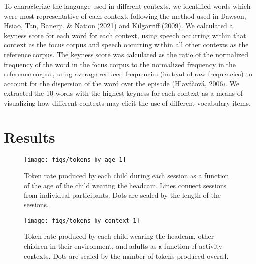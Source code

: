 \documentclass[10pt, letterpaper]{article}
\newenvironment{CodeChunk}{}{}
\begin{document}
To characterize the language used in different contexts, we identified
words which were most representative of each context, following the
method used in Dawson, Hsiao, Tan, Banerji, \& Nation (2021) and
Kilgarriff (2009). We calculated a keyness score for each word for each
context, using speech occurring within that context as the focus corpus
and speech occurring within all other contexts as the reference corpus.
The keyness score was calculated as the ratio of the normalized
frequency of the word in the focus corpus to the normalized frequency in
the reference corpus, using average reduced frequencies (instead of raw
frequencies) to account for the dispersion of the word over the episode
(Hlaváčová, 2006). We extracted the 10 words with the highest keyness
for each context as a means of visualizing how different contexts may
elicit the use of different vocabulary items.

\hypertarget{results}{%
\section{Results}\label{results}}

\begin{CodeChunk}
\begin{figure}[b!]

{\centering \texttt{[image: figs/tokens-by-age-1]} 

}

\caption[Token rate produced by each child during each session as a function of the age of the child wearing the headcam]{Token rate produced by each child during each session as a function of the age of the child wearing the headcam. Lines connect sessions from individual participants. Dots are scaled by the length of the sessions.}\label{fig:tokens-by-age}
\end{figure}
\end{CodeChunk}

\begin{CodeChunk}
\begin{figure}[b!]

{\centering \texttt{[image: figs/tokens-by-context-1]} 

}

\caption[Token rate produced by each child wearing the headcam, other children in their environment, and adults as a function of activity contexts]{Token rate produced by each child wearing the headcam, other children in their environment, and adults as a function of activity contexts. Dots are scaled by the number of tokens produced overall.}\label{fig:tokens-by-context}
\end{figure}
\end{CodeChunk}
\end{document}
